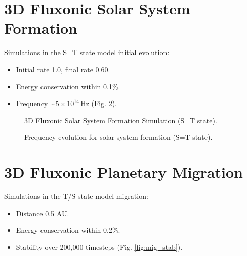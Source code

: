 \documentclass[11pt]{article}
\begin{document}
\section{3D Fluxonic Solar System Formation}
Simulations in the S=T state model initial evolution:
\begin{itemize}
    \item Initial rate 1.0, final rate 0.60.
    \item Energy conservation within 0.1\%.
    \item Frequency \(\sim 5 \times 10^{14} \, \text{Hz}\) (Fig. \ref{fig:form_freq}).
\end{itemize}

\begin{figure}[ht]
    \centering
    \caption{3D Fluxonic Solar System Formation Simulation (S=T state).}
    \label{fig:3Dform}
\end{figure}

\begin{figure}[ht]
    \centering
    \caption{Frequency evolution for solar system formation (S=T state).}
    \label{fig:form_freq}
\end{figure}

\section{3D Fluxonic Planetary Migration}
Simulations in the T/S state model migration:
\begin{itemize}
    \item Distance 0.5 AU.
    \item Energy conservation within 0.2\%.
    \item Stability over 200,000 timesteps (Fig. \ref{fig:mig_stab}).
\end{itemize}
\end{document}
